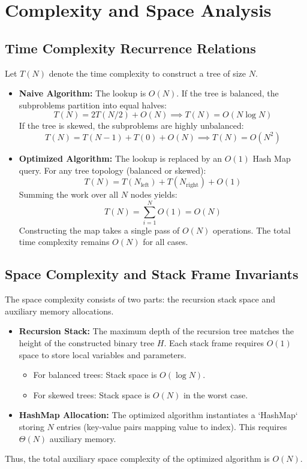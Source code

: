 \documentclass[10pt,journal,compsoc,onecolumn]{IEEEtran}
\begin{document}
\section{Complexity and Space Analysis}
\label{sec:complexity}

\subsection{Time Complexity Recurrence Relations}
Let $T(N)$ denote the time complexity to construct a tree of size $N$. 
\begin{itemize}
    \item \textbf{Naive Algorithm:} The lookup is $O(N)$.
    If the tree is balanced, the subproblems partition into equal halves:
    \[
    T(N) = 2T(N/2) + O(N) \implies T(N) = O(N \log N)
    \]
    If the tree is skewed, the subproblems are highly unbalanced:
    \[
    T(N) = T(N-1) + T(0) + O(N) \implies T(N) = O(N^2)
    \]
    \item \textbf{Optimized Algorithm:} The lookup is replaced by an $O(1)$ Hash Map query.
    For any tree topology (balanced or skewed):
    \[
    T(N) = T(N_{\text{left}}) + T(N_{\text{right}}) + O(1)
    \]
    Summing the work over all $N$ nodes yields:
    \[
    T(N) = \sum_{i=1}^{N} O(1) = O(N)
    \]
    Constructing the map takes a single pass of $O(N)$ operations. The total time complexity remains $O(N)$ for all cases.
\end{itemize}

\subsection{Space Complexity and Stack Frame Invariants}
The space complexity consists of two parts: the recursion stack space and auxiliary memory allocations.
\begin{itemize}
    \item \textbf{Recursion Stack:} The maximum depth of the recursion tree matches the height of the constructed binary tree $H$. Each stack frame requires $O(1)$ space to store local variables and parameters.
    \begin{itemize}
        \item For balanced trees: Stack space is $O(\log N)$.
        \item For skewed trees: Stack space is $O(N)$ in the worst case.
    \end{itemize}
    \item \textbf{HashMap Allocation:} The optimized algorithm instantiates a `HashMap` storing $N$ entries (key-value pairs mapping value to index). This requires $\Theta(N)$ auxiliary memory.
\end{itemize}
Thus, the total auxiliary space complexity of the optimized algorithm is $O(N)$.
\end{document}
